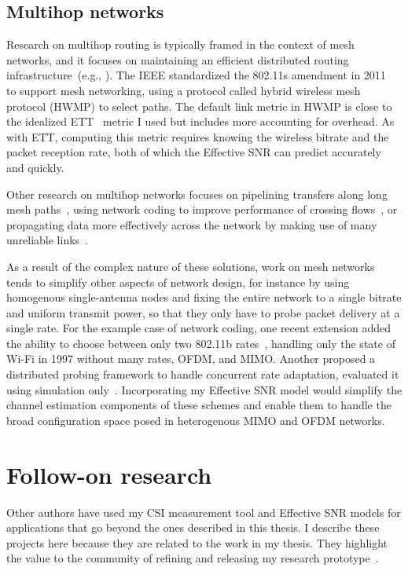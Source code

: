 \subsection{Multihop networks}
Research on multihop routing is typically framed in the context of mesh networks, and it focuses on maintaining an efficient distributed routing infrastructure~(e.g., \cite{Athanasiou_Mesh,RFC_AODV,Draves_ETT,Rozner_SOAR}). The IEEE standardized the 802.11s amendment in 2011~\cite{80211s} to support mesh networking, using a protocol called hybrid wireless mesh protocol (HWMP) to select paths. The default link metric in HWMP is close to the idealized ETT~\cite{Draves_ETT} metric I used but includes more accounting for overhead. As with ETT, computing this metric requires knowing the wireless bitrate and the packet reception rate, both of which the Effective SNR can predict accurately and quickly.

Other research on multihop networks focuses on pipelining transfers along long mesh paths~\cite{Li_BlockSwitched,Li_Mesh,Rodrig_thesis}, using network coding to improve performance of crossing flows~\cite{Katti_ANC,Katti_XORs,Ni_CodingRates}, or propagating data more effectively across the network by making use of many unreliable links~\cite{Biswas_ExOR}.

As a result of the complex nature of these solutions, work on mesh networks tends to simplify other aspects of network design, for instance by using homogenous single-antenna nodes and fixing the entire network to a single bitrate and uniform transmit power, so that they only have to probe packet delivery at a single rate. For the example case of network coding, one recent extension added the ability to choose between only two 802.11b rates~\cite{Ni_CodingRates}, handling only the state of Wi-Fi in 1997 without many rates, OFDM, and MIMO. Another proposed a distributed probing framework to handle concurrent rate adaptation, evaluated it using simulation only~\cite{Kim_NetworkCoding}. Incorporating my Effective SNR model would simplify the channel estimation components of these schemes and enable them to handle the broad configuration space posed in heterogenous MIMO and OFDM networks.

\section{Follow-on research}
Other authors have used my CSI measurement tool and Effective SNR models for applications that go beyond the ones described in this thesis. I describe these projects here because they are related to the work in my thesis. They highlight the value to the community of refining and releasing my research prototype~\cite{Halperin_csitool}.

